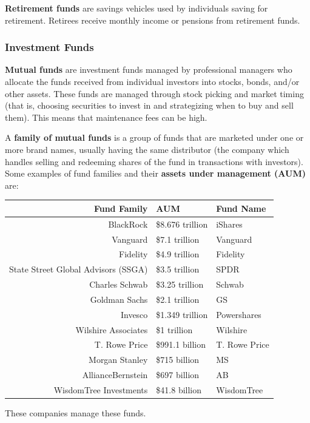 \documentclass{article}
\begin{document}
      \begin{definition}
        \label{def:retirement-funds}
        \textbf{Retirement funds} are savings vehicles used by individuals saving for retirement. Retirees receive monthly income or pensions from retirement funds.
      \end{definition}

    \subsubsection{Investment Funds}

      \begin{definition}
        \label{def:mutual-funds}
        \textbf{Mutual funds} are investment funds managed by professional managers who allocate the funds received from individual investors into stocks, bonds, and/or other assets. These funds are managed through stock picking and market timing (that is, choosing securities to invest in and strategizing when to buy and sell them). This means that maintenance fees can be high. 
      \end{definition}

      \begin{definition}
        \label{def:mutual-fund-family}
        A \textbf{family of mutual funds} is a group of funds that are marketed under one or more brand names, usually having the same distributor (the company which handles selling and redeeming shares of the fund in transactions with investors). Some examples of fund families and their \textbf{assets under management (AUM)} are: 
        \begin{center}
        \begin{tabular}{r|l|l}
          Fund Family & AUM & Fund Name\\
          \hline
          BlackRock & \$8.676 trillion & iShares\\
          Vanguard & \$7.1 trillion & Vanguard\\
          Fidelity & \$4.9 trillion & Fidelity\\
          State Street Global Advisors (SSGA) & \$3.5 trillion & SPDR\\
          Charles Schwab & \$3.25 trillion & Schwab\\
          Goldman Sachs & \$2.1 trillion & GS\\
          Invesco & \$1.349 trillion & Powershares\\
          Wilshire Associates & \$1 trillion & Wilshire\\
          T. Rowe Price & \$991.1 billion & T. Rowe Price \\
          Morgan Stanley & \$715 billion & MS\\
          AllianceBernstein & \$697 billion & AB \\
          WisdomTree Investments & \$41.8 billion & WisdomTree
        \end{tabular}
        \end{center}
        These companies manage these funds. 
      \end{definition}
\end{document}
